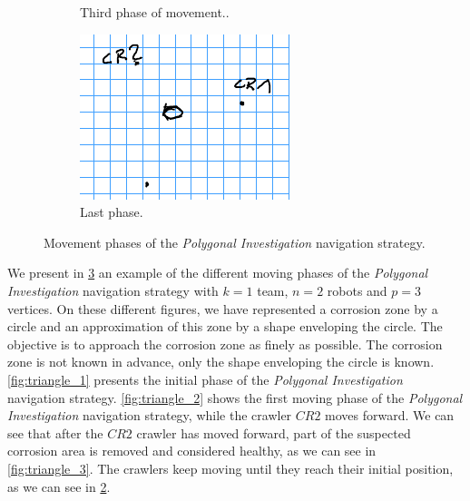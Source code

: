 \begin{figure}[h!]
\begin{subfigure}[t]{0.3\linewidth}
		\caption{Third phase of movement..}
		\label{fig:triangle_6}
	\end{subfigure}
	\hfill
	\begin{subfigure}[t]{0.3\linewidth}
		\centering
		\includegraphics[width=\linewidth]{graphics/triangle_7.png}
		\caption{Last phase.}
		\label{fig:triangle_7}
	\end{subfigure}
		\caption{Movement phases of the \textit{Polygonal Investigation} navigation strategy.}
		\label{fig:triangle}
\end{figure}

We present in \ref{fig:triangle} an example of the different moving phases of the \textit{Polygonal Investigation} navigation strategy with $k = 1$ team, $n = 2$ robots and $p = 3$ vertices.
On these different figures, we have represented a corrosion zone by a circle and an approximation of this zone by a shape enveloping the circle.
The objective is to approach the corrosion zone as finely as possible.
The corrosion zone is not known in advance, only the shape enveloping the circle is known.
\ref{fig:triangle_1} presents the initial phase of the \textit{Polygonal Investigation} navigation strategy.
\ref{fig:triangle_2} shows the first moving phase of the \textit{Polygonal Investigation} navigation strategy, while the crawler $CR2$ moves forward.
We can see that after the $CR2$ crawler has moved forward, part of the suspected corrosion area is removed and considered healthy, as we can see in \ref{fig:triangle_3}.
The crawlers keep moving until they reach their initial position, as we can see in \ref{fig:triangle_7}.


